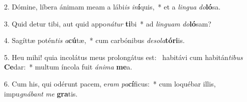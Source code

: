 2. Dómine, líbera ánimam meam a lábi\textit{is} \textit{in}\textbf{í}quis,~*  et a \textit{lin}\textit{gua} \textit{do}\textbf{ló}sa.\

3. Quid detur tibi, aut quid appo\textit{ná}\textit{tur} \textbf{ti}bi~*  ad \textit{lin}\textit{guam} \textit{do}\textbf{ló}sam?\

4. Sagíttæ potén\textit{tis} \textit{a}\textbf{cú}tæ,~*  cum carbónibus \textit{de}\textit{so}\textit{la}\textbf{tó}\textbf{ri}is.\

5. Heu mihi! quia incolátus meus prolongátus est: \dag\  habitávi cum habitán\textit{ti}\textit{bus} \textbf{Ce}dar:~*  multum íncola fuit \textit{á}\textit{ni}\textit{ma} \textbf{me}a.\

6. Cum his, qui odérunt pacem, e\textit{ram} \textit{pa}\textbf{cí}ficus:~*  cum loquébar illis, impu\textit{gná}\textit{bant} \textit{me} \textbf{gra}tis.\

